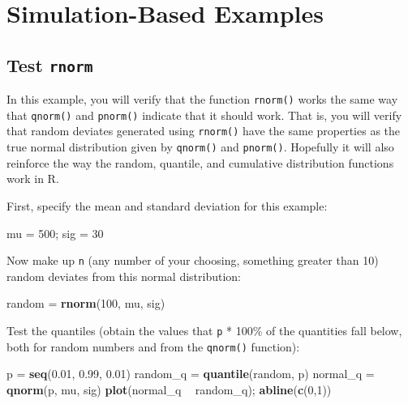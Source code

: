\documentclass[]{book}
\newenvironment{Shaded}{\begin{snugshade}}{\end{snugshade}}
\newcommand{\KeywordTok}[1]{\textcolor[rgb]{0.13,0.29,0.53}{\textbf{#1}}}
\newcommand{\DecValTok}[1]{\textcolor[rgb]{0.00,0.00,0.81}{#1}}
\newcommand{\FloatTok}[1]{\textcolor[rgb]{0.00,0.00,0.81}{#1}}
\newcommand{\StringTok}[1]{\textcolor[rgb]{0.31,0.60,0.02}{#1}}
\newcommand{\OperatorTok}[1]{\textcolor[rgb]{0.81,0.36,0.00}{\textbf{#1}}}
\newcommand{\NormalTok}[1]{#1}
\theoremstyle{definition}
\theoremstyle{definition}
\theoremstyle{definition}
\theoremstyle{remark}
\begin{document}
\section{Simulation-Based Examples}\label{sim-examples}

\subsection{\texorpdfstring{Test
\texttt{rnorm}}{Test rnorm}}\label{rnorm-ex}

In this example, you will verify that the function \texttt{rnorm()}
works the same way that \texttt{qnorm()} and \texttt{pnorm()} indicate
that it should work. That is, you will verify that random deviates
generated using \texttt{rnorm()} have the same properties as the true
normal distribution given by \texttt{qnorm()} and \texttt{pnorm()}.
Hopefully it will also reinforce the way the random, quantile, and
cumulative distribution functions work in R.

First, specify the mean and standard deviation for this example:

\begin{Shaded}
\begin{Highlighting}[]
\NormalTok{mu =}\StringTok{ }\DecValTok{500}\NormalTok{; sig =}\StringTok{ }\DecValTok{30}
\end{Highlighting}
\end{Shaded}

Now make up \texttt{n} (any number of your choosing, something greater
than 10) random deviates from this normal distribution:

\begin{Shaded}
\begin{Highlighting}[]
\NormalTok{random =}\StringTok{ }\KeywordTok{rnorm}\NormalTok{(}\DecValTok{100}\NormalTok{, mu, sig)}
\end{Highlighting}
\end{Shaded}

Test the quantiles (obtain the values that \texttt{p} * 100\% of the
quantities fall below, both for random numbers and from the
\texttt{qnorm()} function):

\begin{Shaded}
\begin{Highlighting}[]
\NormalTok{p =}\StringTok{ }\KeywordTok{seq}\NormalTok{(}\FloatTok{0.01}\NormalTok{, }\FloatTok{0.99}\NormalTok{, }\FloatTok{0.01}\NormalTok{)}
\NormalTok{random_q =}\StringTok{ }\KeywordTok{quantile}\NormalTok{(random, p)}
\NormalTok{normal_q =}\StringTok{ }\KeywordTok{qnorm}\NormalTok{(p, mu, sig)}
\KeywordTok{plot}\NormalTok{(normal_q }\OperatorTok{~}\StringTok{ }\NormalTok{random_q); }\KeywordTok{abline}\NormalTok{(}\KeywordTok{c}\NormalTok{(}\DecValTok{0}\NormalTok{,}\DecValTok{1}\NormalTok{))}
\end{Highlighting}
\end{Shaded}
\end{document}
